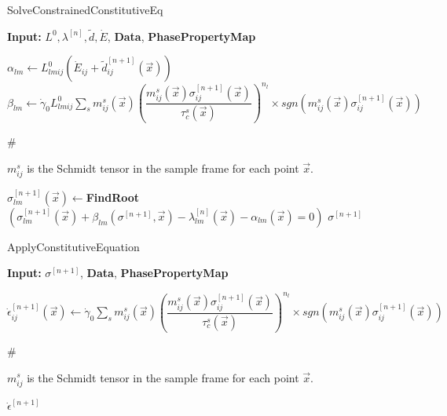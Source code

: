 \documentclass[11pt]{article}
\newcommand{\AlgoInput}{\textbf{Input: }}
\newcommand\LONGCOMMENT[1]{%
  \hfill\#\ \begin{minipage}[t]{\eqboxwidth{COMMENT}}#1\strut\end{minipage}%
}
\begin{document}
\begin{algorithm}
\caption{SolveConstrainedConstitutiveEq}
\AlgoInput{ $L^0, \lambda^{[n]}, \tilde{d}, \dot{E}$, \textbf{Data}, \textbf{PhasePropertyMap} }

\label{Algo:ConstrainedConEq}
\begin{algorithmic}

\STATE $ \alpha_{lm} \leftarrow L^0_{lmij} \left( \dot{E}_{ij} + \tilde{d}_{ij}^{[n+1]}(\vec{x}) \right) $
\STATE $ \beta_{lm} \leftarrow  \dot{\gamma}_0 L^0_{lmij} 
\sum_s m_{ij}^s(\vec{x}) \left( \dfrac{m^s_{ij}(\vec{x}) \sigma^{[n+1]}_{ij} (\vec{x})}{\tau_c^s(\vec{x})} \right)^{n_l} \times sgn \left( m^s_{ij}(\vec{x}) \sigma^{[n+1]}_{ij} (\vec{x}) \right)$ 

\LONGCOMMENT{$ m^s_{ij} $ is the Schmidt tensor in the sample frame for each point $ \vec{x} $.}


\STATE	$ \sigma^{[n+1]}_{lm}(\vec{x}) \leftarrow $\textbf{FindRoot}$ \left(  \sigma_{lm}^{[n+1]}(\vec{x}) + \beta_{lm}( \sigma^{[n+1]}, \vec{x}) - \lambda_{lm}^{[n]}( \vec{x}) - \alpha_{lm}(\vec{x})=0 \right )$ 
\ENDFOR
\RETURN $ \sigma^{[n+1]} $
\end{algorithmic}
\end{algorithm}





\begin{algorithm}
\caption{ApplyConstitutiveEquation}
\AlgoInput{ $\sigma^{[n+1]}$, \textbf{Data}, \textbf{PhasePropertyMap} }

\label{Algo:ApplyConstitutiveEquation}
\begin{algorithmic}


\STATE $ \dot{\epsilon}_{ij}^{[n+1]}(\vec{x}) \leftarrow  
\dot{\gamma}_0\sum_s m_{ij}^s(\vec{x}) \left( \dfrac{m^s_{ij}(\vec{x}) \sigma^{[n+1]}_{ij} (\vec{x})}{\tau_c^s(\vec{x})} \right)^{n_l} \times sgn \left( m^s_{ij}(\vec{x}) \sigma^{[n+1]}_{ij} (\vec{x}) \right)$ 

\LONGCOMMENT{$ m^s_{ij} $ is the Schmidt tensor in the sample frame for each point $ \vec{x} $.}

\ENDFOR
\RETURN $ \dot{\epsilon}^{[n+1]} $
\end{algorithmic}
\end{algorithm}
\end{document}
